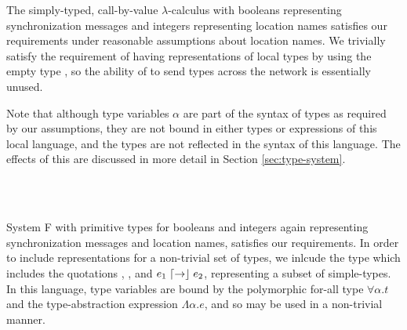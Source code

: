 \begin{ex}
  \label{ex:st-lambda}
  The simply-typed, call-by-value $\lambda$-calculus with booleans representing synchronization messages and integers representing location names satisfies our requirements under reasonable assumptions about location names.
  We trivially satisfy the requirement of having representations of local types by using the empty type \Empty, so the ability of \langname to send types across the network is essentially unused.

  Note that although type variables $\alpha$ are part of the syntax of types as required by our assumptions, they are not bound in either types or expressions of this local language, and the types are not reflected in the syntax of this language.
  The effects of this are discussed in more detail in Section \ref{sec:type-system}.
  \begin{syntax}
  	 \alternative{\alpha} \alternative{\Int} \alternative{\Bool} \alternative{\Empty} 
       \\
     \\
    \alternative{\True} \alternative{\False} 
  \end{syntax}
\end{ex}

\begin{ex}[System F]
  \label{ex:system-f}
  System F with primitive types for booleans and integers again representing synchronization messages and location names, satisfies our requirements.
  In order to include representations for a non-trivial set of types, we inlcude the type \Typ which includes the quotations \say{\Int}, \say{\Bool}, and $e_1 \mathrel{\lceil\mathord{\to}\rfloor} e_2$, representing a subset of simple-types.
  In this language, type variables are bound by the polymorphic for-all type $\forall \alpha.t$ and the type-abstraction expression $\Lambda \alpha.e$, and so may be used in a non-trivial manner.
  \begin{syntax}
  	 \alternative{\alpha} \alternative{\Int} \alternative{\Bool} \alternative{\Typ}\\
  	 
         \\
     \\
    \alternative{\True} \alternative{\False} \\
    \alternative{\say{\Int}} \alternative{\say{\Bool}} 
  \end{syntax}
\end{ex}

